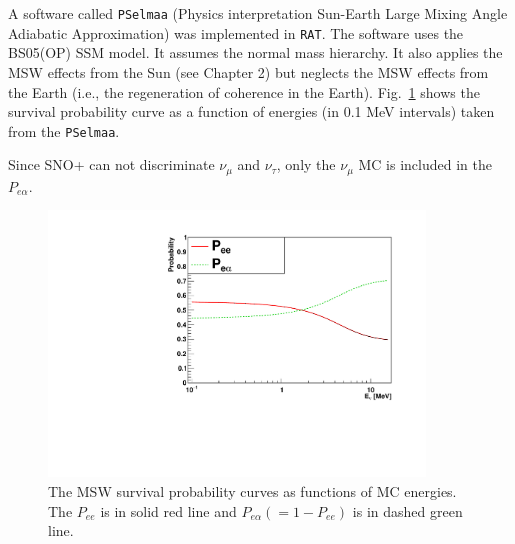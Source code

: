 A software called \texttt{PSelmaa} (Physics interpretation Sun-Earth Large Mixing Angle Adiabatic
Approximation) was implemented in \texttt{RAT}\cite{fady_pselmaa}. The software uses the BS05(OP) SSM model. It assumes the normal mass hierarchy. It also applies the MSW effects from the Sun (see Chapter 2) but neglects the MSW effects from the Earth (i.e., the regeneration of coherence in the Earth). Fig.~\ref{fig:pselmaa_curves} shows the survival probability curve as a function of energies (in 0.1 MeV intervals) taken from the \texttt{PSelmaa}.

Since SNO+ can not discriminate $\nu_\mu$ and $\nu_\tau$, only the $\nu_\mu$ MC is included in the $P_{e\alpha}$.

\begin{figure}[!htb]
	\centering
	\includegraphics[width=10cm]{PSelmaa_bs05op.pdf}
	\caption[The MSW survival probability curves as functions of MC energies.]{The MSW survival probability curves as functions of MC energies. The $P_{ee}$ is in solid red line and $P_{e\alpha}(=1-P_{ee})$ is in dashed green line.}
	\label{fig:pselmaa_curves}
\end{figure}


